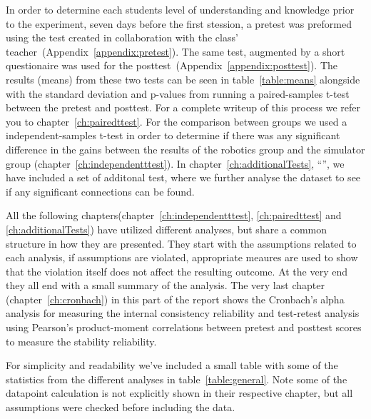 In order to determine each students level of understanding and knowledge prior to the experiment, seven days before the first stession, a pretest was preformed using the test created in collaboration with the class' teacher~(Appendix~\ref{appendix:pretest}). 
The same test, augmented by a short questionaire was used for the posttest~(Appendix~\ref{appendix:posttest}). The results (means) from these two tests can be seen in table~\ref{table:means} alongside with the standard deviation and p-values from running a paired-samples t-test between the pretest and posttest. For a complete writeup of this process we refer you to chapter~\ref{ch:pairedttest}.
For the comparison between groups we used a independent-samples t-test in order to determine if there was any
significant difference in the gains between the results of the robotics group and the simulator group (chapter~\ref{ch:independentttest}).
In chapter~\ref{ch:additionalTests}, "`"', we have included a set of additonal test,
where we further analyse the dataset to see if any significant connections can be found. 

\bigskip\noindent
All the following chapters(chapter~\ref{ch:independentttest}, \ref{ch:pairedttest} and \ref{ch:additionalTests}) have utilized different analyses, but share a common structure in how they are presented.
They start with the assumptions related to each analysis, if assumptions are violated, appropriate meaures are used to show that the violation itself does not affect the resulting outcome.
At the very end they all end with a small summary of the analysis. 
The very last chapter (chapter~\ref{ch:cronbach}) in this part of the report shows the Cronbach's alpha analysis for measuring the internal consistency reliability and test-retest analysis using Pearson's product-moment correlations between pretest and posttest scores to measure the stability reliability.

\bigskip\noindent
For simplicity and readability we've included a small table with some of the statistics from the different analyses in table~\ref{table:general}. Note some of the datapoint calculation is not explicitly shown in their respective chapter, but all assumptions were checked before including the data.


